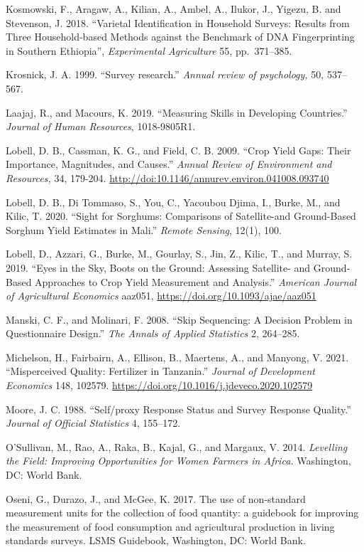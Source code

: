 \documentclass[
]{book}
\begin{document}
Kosmowski, F., Aragaw, A., Kilian, A., Ambel, A., Ilukor, J., Yigezu, B. and Stevenson, J. 2018. ``Varietal Identification in Household Surveys: Results from Three Household‐based Methods against the Benchmark of DNA Fingerprinting in Southern Ethiopia'', \emph{Experimental Agriculture} 55, pp.~371--385.

Krosnick, J. A. 1999. ``Survey research.'' \emph{Annual review of psychology,} 50, 537--567.

Laajaj, R., and Macours, K. 2019. ``Measuring Skills in Developing Countries.'' \emph{Journal of Human Resources}, 1018-9805R1.

Lobell, D. B., Cassman, K. G., and Field, C. B. 2009. ``Crop Yield Gaps: Their Importance, Magnitudes, and Causes.'' \emph{Annual Review of Environment and Resources,} 34, 179-204. \url{http://doi:10.1146/annurev.environ.041008.093740}

Lobell, D. B., Di Tommaso, S., You, C., Yacoubou Djima, I., Burke, M., and Kilic, T. 2020. ``Sight for Sorghums: Comparisons of Satellite-and Ground-Based Sorghum Yield Estimates in Mali.'' \emph{Remote Sensing}, 12(1), 100.

Lobell, D., Azzari, G., Burke, M., Gourlay, S., Jin, Z., Kilic, T., and Murray, S. 2019. ``Eyes in the Sky, Boots on the Ground: Assessing Satellite- and Ground-Based Approaches to Crop Yield Measurement and Analysis.'' \emph{American Journal of Agricultural Economics} aaz051, \url{https://doi.org/10.1093/ajae/aaz051}

Manski, C. F., and Molinari, F. 2008. ``Skip Sequencing: A Decision Problem in Questionnaire Design.'' \emph{The Annals of Applied Statistics} 2, 264--285.

Michelson, H., Fairbairn, A., Ellison, B., Maertens, A., and Manyong, V. 2021. ``Misperceived Quality: Fertilizer in Tanzania.'' \emph{Journal of Development Economics} 148, 102579. \url{https://doi.org/10.1016/j.jdeveco.2020.102579}

Moore, J. C. 1988. ``Self/proxy Response Status and Survey Response Quality.'' \emph{Journal of Official Statistics} 4, 155--172.

O'Sullivan, M., Rao, A., Raka, B., Kajal, G., and Margaux, V. 2014. \emph{Levelling the Field: Improving Opportunities for Women Farmers in Africa.} Washington, DC: World Bank.

Oseni, G., Durazo, J., and McGee, K. 2017. The use of non-standard measurement units for the collection of food quantity: a guidebook for improving the measurement of food consumption and agricultural production in living standards surveys. LSMS Guidebook, Washington, DC: World Bank.
\end{document}
